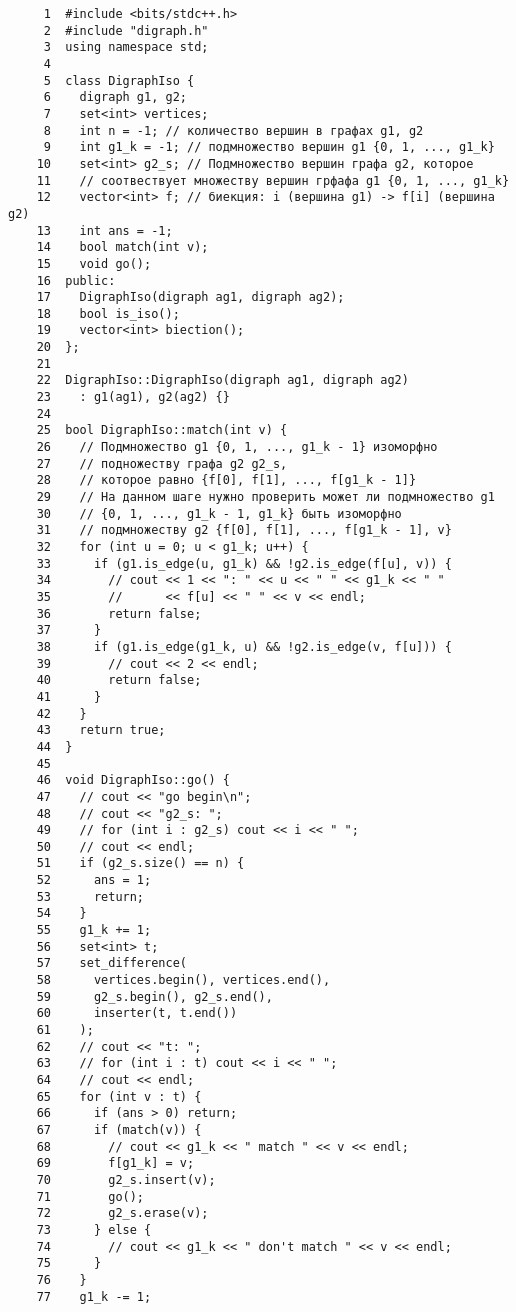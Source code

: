 \begin{verbatim}
     1	#include <bits/stdc++.h>
     2	#include "digraph.h"
     3	using namespace std;
     4	
     5	class DigraphIso {
     6	  digraph g1, g2;
     7	  set<int> vertices;
     8	  int n = -1; // количество вершин в графах g1, g2
     9	  int g1_k = -1; // подмножество вершин g1 {0, 1, ..., g1_k}
    10	  set<int> g2_s; // Подмножество вершин графа g2, которое
    11	  // соотвествует множеству вершин грфафа g1 {0, 1, ..., g1_k}
    12	  vector<int> f; // биекция: i (вершина g1) -> f[i] (вершина g2)
    13	  int ans = -1;
    14	  bool match(int v);
    15	  void go();
    16	public:
    17	  DigraphIso(digraph ag1, digraph ag2);
    18	  bool is_iso();
    19	  vector<int> biection();
    20	};
    21	
    22	DigraphIso::DigraphIso(digraph ag1, digraph ag2)
    23	  : g1(ag1), g2(ag2) {}
    24	
    25	bool DigraphIso::match(int v) {
    26	  // Подмножество g1 {0, 1, ..., g1_k - 1} изоморфно
    27	  // подножеству графа g2 g2_s,
    28	  // которое равно {f[0], f[1], ..., f[g1_k - 1]}
    29	  // На данном шаге нужно проверить может ли подмножество g1
    30	  // {0, 1, ..., g1_k - 1, g1_k} быть изоморфно
    31	  // подмножеству g2 {f[0], f[1], ..., f[g1_k - 1], v}
    32	  for (int u = 0; u < g1_k; u++) {
    33	    if (g1.is_edge(u, g1_k) && !g2.is_edge(f[u], v)) {
    34	      // cout << 1 << ": " << u << " " << g1_k << " "
    35	      //      << f[u] << " " << v << endl;
    36	      return false;
    37	    }
    38	    if (g1.is_edge(g1_k, u) && !g2.is_edge(v, f[u])) {
    39	      // cout << 2 << endl;
    40	      return false;
    41	    }
    42	  }
    43	  return true;
    44	}
    45	
    46	void DigraphIso::go() {
    47	  // cout << "go begin\n";
    48	  // cout << "g2_s: ";
    49	  // for (int i : g2_s) cout << i << " ";
    50	  // cout << endl;
    51	  if (g2_s.size() == n) {
    52	    ans = 1;
    53	    return;
    54	  }
    55	  g1_k += 1;
    56	  set<int> t;
    57	  set_difference(
    58	    vertices.begin(), vertices.end(),
    59	    g2_s.begin(), g2_s.end(),
    60	    inserter(t, t.end())
    61	  );
    62	  // cout << "t: ";
    63	  // for (int i : t) cout << i << " ";
    64	  // cout << endl;
    65	  for (int v : t) {
    66	    if (ans > 0) return;
    67	    if (match(v)) {
    68	      // cout << g1_k << " match " << v << endl;
    69	      f[g1_k] = v;
    70	      g2_s.insert(v);
    71	      go();
    72	      g2_s.erase(v);
    73	    } else {
    74	      // cout << g1_k << " don't match " << v << endl;
    75	    }
    76	  }
    77	  g1_k -= 1;

\end{verbatim}
